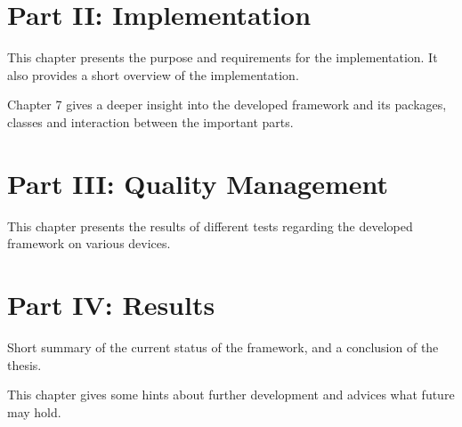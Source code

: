 \section*{Part II: Implementation}

  \vspace{1mm}

\noindent  This chapter presents the purpose and requirements for the implementation. It also provides a short overview of the implementation. \\

  \vspace{1mm}

\noindent  Chapter 7 gives a deeper insight into the developed framework and its packages, classes and interaction between the important parts. \\

\section*{Part III: Quality Management}

  \vspace{1mm}

\noindent  This chapter presents the results of different tests regarding the developed framework on various devices. \\

\section*{Part IV: Results}

  \vspace{1mm}

\noindent  Short summary of the current status of the framework, and a conclusion of the thesis. \\

  \vspace{1mm}

\noindent  This chapter gives some hints about further development and advices what future may hold. \\
